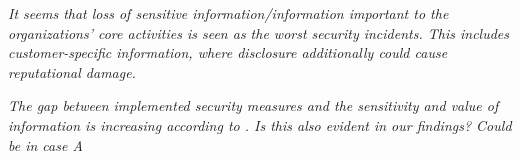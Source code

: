 \textit{It seems that loss of sensitive information/information important to the organizations' core activities is seen as the worst security incidents. This includes customer-specific information, where disclosure additionally could cause reputational damage.}

\textit{The gap between implemented security measures and the sensitivity and value of information is increasing according to \cite{Morketall2012}. Is this also evident in our findings? Could be in case A}
